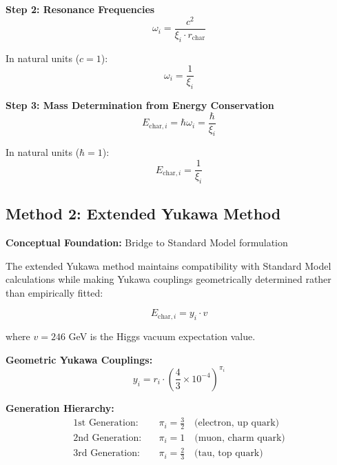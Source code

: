 \documentclass[12pt,a4paper]{article}
\begin{document}
	\textbf{Step 2: Resonance Frequencies}
	\begin{equation}
		\omega_i = \frac{c^2}{\xi_i \cdot r_{\text{char}}}
		\label{eq:resonance_frequencies}
	\end{equation}
	
	In natural units ($c = 1$):
	\begin{equation}
		\omega_i = \frac{1}{\xi_i}
	\end{equation}
	
	\textbf{Step 3: Mass Determination from Energy Conservation}
	\begin{equation}
		E_{\text{char},i} = \hbar \omega_i = \frac{\hbar}{\xi_i}
		\label{eq:energy_from_frequency}
	\end{equation}
	
	In natural units ($\hbar = 1$):
	\begin{equation}
		\boxed{E_{\text{char},i} = \frac{1}{\xi_i}}
		\label{eq:characteristic_energy_direct}
	\end{equation}
	
	\subsection{Method 2: Extended Yukawa Method}
	\label{subsec:extended_yukawa_method}
	
	\textbf{Conceptual Foundation:} Bridge to Standard Model formulation
	
	The extended Yukawa method maintains compatibility with Standard Model calculations while making Yukawa couplings geometrically determined rather than empirically fitted:
	
	\begin{equation}
		E_{\text{char},i} = y_i \cdot v
		\label{eq:yukawa_mass_formula}
	\end{equation}
	
	where $v = 246$ GeV is the Higgs vacuum expectation value.
	
	\textbf{Geometric Yukawa Couplings:}
	\begin{equation}
		\boxed{y_i = r_i \cdot \left(\frac{4}{3} \times 10^{-4}\right)^{\pi_i}}
		\label{eq:geometric_yukawa}
	\end{equation}
	
	\textbf{Generation Hierarchy:}
	\begin{align}
		\text{1st Generation:} \quad &\pi_i = \frac{3}{2} \quad \text{(electron, up quark)} \\
		\text{2nd Generation:} \quad &\pi_i = 1 \quad \text{(muon, charm quark)} \\
		\text{3rd Generation:} \quad &\pi_i = \frac{2}{3} \quad \text{(tau, top quark)}
	\end{align}
	
\end{document}
